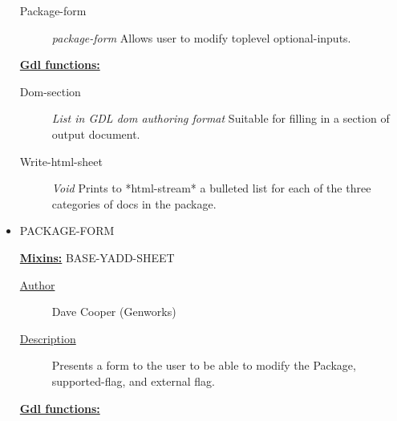 \documentclass [11pt]{book}
\begin{document}
\begin{itemize}
\begin{description}

\item [Package-form]
\emph{package-form} Allows user to modify toplevel optional-inputs.


\end{description}






\textbf{
\underline{Gdl functions:}}

\begin{description}

\item [Dom-section]
\emph{List in GDL dom authoring format} Suitable for filling in a section of output document.


\item [Write-html-sheet]
\emph{Void} Prints to *html-stream* a bulleted list for each of the three categories of docs in the package.


\end{description}







\item {}PACKAGE-FORM


\textbf{
\underline{Mixins:}} BASE-YADD-SHEET





\begin{description}

\item [
\underline{Author}]


Dave Cooper (Genworks)



\item [
\underline{Description}]


Presents a form to the user to be able to modify the Package, 
supported-flag, and external flag.



\end{description}








\textbf{
\underline{Gdl functions:}}


\end{itemize}
\end{document}
